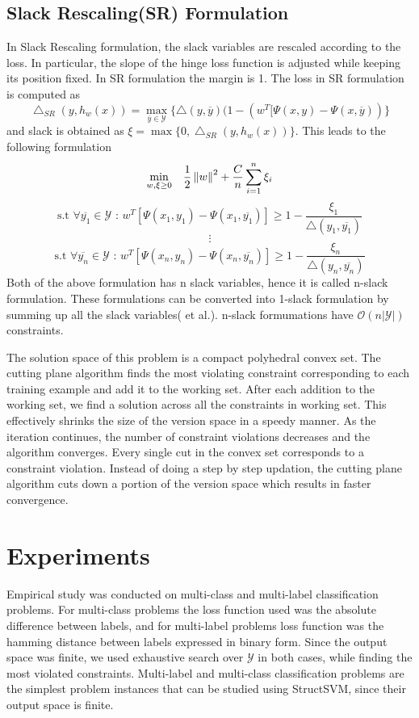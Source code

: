\subsection{Slack Rescaling(SR) Formulation}
In Slack Rescaling formulation, the slack variables are rescaled according to the loss. In particular, the slope of the hinge loss function is adjusted while keeping its position fixed. In SR formulation the margin is 1. The loss in SR formulation is computed as
\[ \bigtriangleup_{SR}(y, h_w(x)) =  \underset{\overline{y} \in \mathcal{Y}}{\max}\{ \bigtriangleup(y, \overline{y})(1 - (w^T[\Psi(x, y) - \Psi(x, \overline{y})) \} \]
and slack is obtained as $\xi = \max\{0, \bigtriangleup_{SR}(y, h_w(x))\}$. This leads to the following formulation
\[\underset{w, \xi \geq 0}{\min} \quad \frac{1}{2} \left\lVert w\right\rVert^2 + \frac{C}{n} \sum_{i=1}^n \xi_i \]
\[ \textrm{s.t } \forall \overline{y_1} \in \mathcal{Y} \textrm{  :  } w^T[\Psi(x_1, y_1) - \Psi(x_1, \overline{y_1})] \geq 1 - \frac{\xi_1}{\bigtriangleup(y_1, \overline{y_1})} \]
\[ \vdots \]
\[ \textrm{s.t } \forall \overline{y_n} \in \mathcal{Y} \textrm{  :  } w^T[\Psi(x_n, y_n) - \Psi(x_n, \overline{y_n})] \geq 1 - \frac{\xi_n}{\bigtriangleup(y_n, \overline{y_n})} \]
Both of the above formulation has n slack variables, hence it is called n-slack formulation. These formulations can be converted into 1-slack formulation by summing up all the slack variables(\cite{joachims_cutting} et al.). n-slack formumations have $\mathcal{O}(n|\mathcal{Y}|)$ constraints.

The solution space of this problem is a compact polyhedral convex set. The cutting plane algorithm finds the most violating constraint corresponding to each training example and add it to the working set. After each addition to the working set, we find a solution across all the constraints in working set. This effectively shrinks the size of the version space in a speedy manner. As the iteration continues, the number of constraint violations decreases and the algorithm converges. Every single cut in the convex set corresponds to a constraint violation. Instead of doing a step by step updation, the cutting plane algorithm cuts down a portion of the version space which results in faster convergence.
\section{Experiments} 
\label{chap5_exp}
Empirical study was conducted on multi-class and multi-label classification problems. For multi-class problems the loss function used was the absolute difference between labels, and for multi-label problems loss function was the hamming distance between labels expressed in binary form. Since the output space was finite, we used exhaustive search over $\mathcal{Y}$ in both cases, while finding the most violated constraints. Multi-label and multi-class classification problems are the simplest problem instances that can be studied using StructSVM, since their output space is finite.

